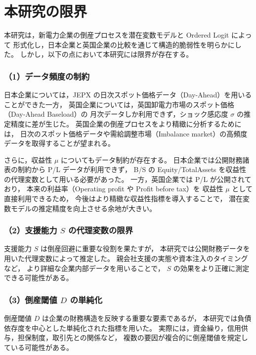 \section{本研究の限界}

本研究は，新電力企業の倒産プロセスを潜在変数モデルと Ordered Logit によって
形式化し，日本企業と英国企業の比較を通じて構造的脆弱性を明らかにした。
しかし，以下の点において本研究には限界が存在する。

\subsubsection*{（1）データ頻度の制約}

日本企業については，JEPX の日次スポット価格データ（Day-Ahead）を用いることができた一方，
英国企業については，英国卸電力市場のスポット価格（Day-Ahead Baseload）の
月次データしか利用できず，ショック感応度 $\sigma$ の推定精度に差が生じた。
英国企業の倒産プロセスをより精緻に分析するためには，
日次のスポット価格データや需給調整市場（Imbalance market）の高頻度データを取得することが望まれる。

さらに，収益性 $\mu$ についてもデータ制約が存在する。
日本企業では公開財務諸表の制約から P/L データが利用できず，
B/S の Equity/TotalAssets を収益性の代理変数として用いる必要があった。
一方，英国企業では P/L が公開されており，
本来の利益率（Operating profit や Profit before tax）を
収益性 $\mu$ として直接利用できるため，
今後はより精緻な収益性指標を導入することで，
潜在変数モデルの推定精度を向上させる余地が大きい。

\subsubsection*{（2）支援能力 $S$ の代理変数の限界}

支援能力 $S$ は倒産回避に重要な役割を果たすが，
本研究では公開財務データを用いた代理変数によって推定した。
親会社支援の実態や資本注入のタイミングなど，
より詳細な企業内部データを用いることで，
$S$ の効果をより正確に測定できる可能性がある。

\subsubsection*{（3）倒産閾値 $D$ の単純化}

倒産閾値 $D$ は企業の財務構造を反映する重要な要素であるが，
本研究では負債依存度を中心とした単純化された指標を用いた。
実際には，資金繰り，信用供与，担保制度，取引先との関係など，
複数の要因が複合的に倒産閾値を規定している可能性がある。

